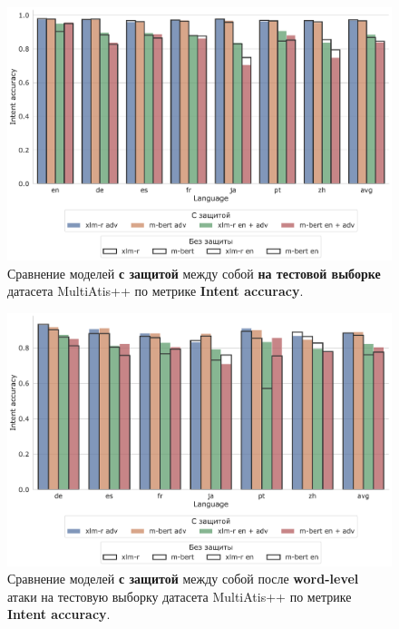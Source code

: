 \begin{figure}[h!]
    \centering
    \includegraphics[width=\textwidth]{images/9}
    \caption{Сравнение моделей \textbf{с защитой} между собой \textbf{на тестовой выборке} датасета MultiAtis++ по метрике \textbf{Intent accuracy}.}\label{fig:figure9}
\end{figure}

\begin{figure}[h!]
    \centering
    \includegraphics[width=\textwidth]{images/12}
    \caption{Сравнение моделей \textbf{с защитой} между собой после \textbf{word-level} атаки на тестовую выборку датасета MultiAtis++ по метрике \textbf{Intent accuracy}.}\label{fig:figure12}
\end{figure}


